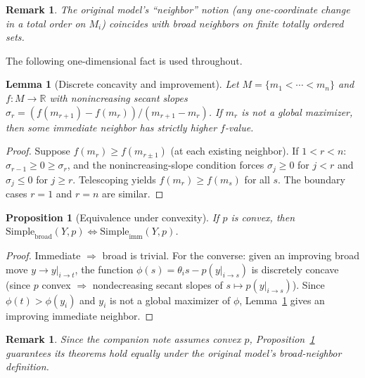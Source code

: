 \documentclass[11pt]{article}
\newtheorem{lemma}[theorem]{Lemma}
\newtheorem{proposition}[theorem]{Proposition}
\newtheorem{remark}[theorem]{Remark}
\newcommand{\R}{\mathbb{R}}
\newcommand{\Simplebroad}{\mathrm{Simple}_{\mathrm{broad}}}
\newcommand{\Simpleimm}{\mathrm{Simple}_{\mathrm{imm}}}
\begin{document}
\begin{remark}\label{rem:model-def}
The original model's ``neighbor'' notion (any one-coordinate change in
a total order on $M_i$) coincides with broad neighbors on finite
totally ordered sets.
\end{remark}

The following one-dimensional fact is used throughout.

\begin{lemma}[Discrete concavity and improvement]%
\label{lem:concave-chain}
Let $M = \{m_1 < \cdots < m_n\}$ and $f \colon M \to \R$ with
nonincreasing secant slopes $\sigma_r = (f(m_{r+1}) - f(m_r)) /
(m_{r+1} - m_r)$.  If $m_r$ is not a global maximizer, then some
immediate neighbor has strictly higher $f$-value.
\end{lemma}

\begin{proof}
Suppose $f(m_r) \geq f(m_{r \pm 1})$ (at each existing neighbor).
If $1 < r < n$: $\sigma_{r-1} \geq 0 \geq \sigma_r$, and the
nonincreasing-slope condition forces $\sigma_j \geq 0$ for $j < r$
and $\sigma_j \leq 0$ for $j \geq r$.  Telescoping yields
$f(m_r) \geq f(m_s)$ for all $s$.  The boundary cases $r = 1$ and
$r = n$ are similar.
\end{proof}

\begin{proposition}[Equivalence under convexity]%
\label{prop:equiv-convex}
If $p$ is convex, then $\Simplebroad(Y, p) \Leftrightarrow
\Simpleimm(Y, p)$.
\end{proposition}

\begin{proof}
Immediate $\Rightarrow$ broad is trivial.  For the converse: given an
improving broad move $y \to y|_{i \to t}$, the function
$\phi(s) = \theta_i s - p(y|_{i \to s})$ is discretely concave
(since $p$ convex $\Rightarrow$ nondecreasing secant slopes of
$s \mapsto p(y|_{i \to s})$).  Since $\phi(t) > \phi(y_i)$ and $y_i$
is not a global maximizer of $\phi$, Lemma~\ref{lem:concave-chain}
gives an improving immediate neighbor.
\end{proof}

\begin{remark}\label{rem:model-applies}
Since the companion note assumes convex $p$,
Proposition~\ref{prop:equiv-convex} guarantees its theorems hold
equally under the original model's broad-neighbor definition.
\end{remark}

\end{document}
